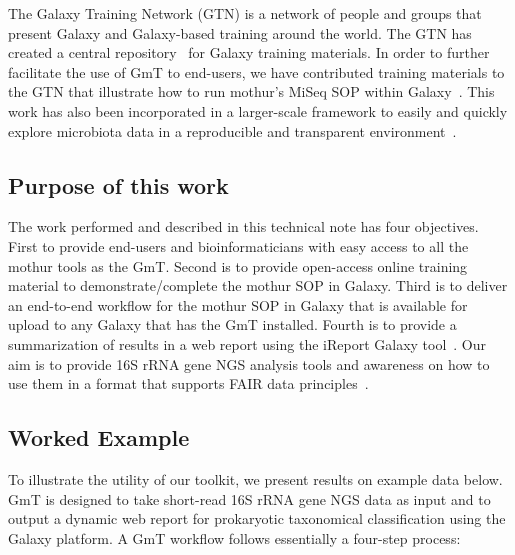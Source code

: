 The Galaxy Training Network (GTN) is a network of people and groups that present Galaxy and Galaxy-based training around the world. The GTN has created a central repository~\cite{gtn-repo} for Galaxy training materials. In order to further facilitate the use of GmT to end-users, we have contributed training materials to the GTN that illustrate how to run mothur's MiSeq SOP within Galaxy~\cite{gmt-training}. This work has also been incorporated in a larger-scale framework to easily and quickly explore microbiota data in a reproducible and transparent environment~\cite{batut2017asaim}.

\subsection*{Purpose of this work}
The work performed and described in this technical note has four objectives. First to provide end-users and bioinformaticians with easy access to all the mothur tools as the GmT. Second is to provide open-access online training material to demonstrate/complete the mothur SOP in Galaxy.  Third is to deliver an end-to-end workflow for the mothur SOP in Galaxy that is available for upload to any Galaxy that has the GmT installed.  Fourth is to provide a summarization of results in a web report using the iReport Galaxy tool~\cite{hiltemann2014ireport}. Our aim is to provide 16S rRNA gene NGS analysis tools and awareness on how to use them in a format that supports FAIR data principles~\cite{wilkinson2016fair}.

\subsection*{Worked Example}
To illustrate the utility of our toolkit, we present results on example data below. GmT is designed to take short-read 16S rRNA gene NGS data as input and to output a dynamic web report for prokaryotic taxonomical classification using the Galaxy platform.  A GmT workflow follows essentially a four-step process:

